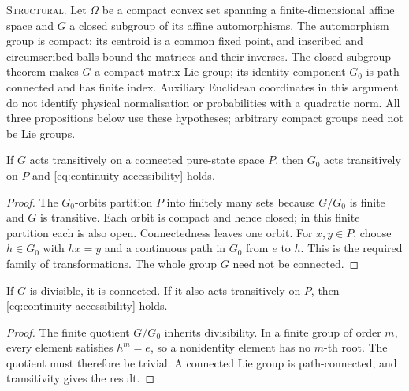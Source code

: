 \noindent\textsc{Structural.}
Let $\Omega$ be a compact convex set spanning a finite-dimensional affine
space and $G$ a closed subgroup of its affine automorphisms. The
automorphism group is compact: its centroid is a common fixed point, and
inscribed and circumscribed balls bound the matrices and their inverses.
The closed-subgroup theorem makes $G$ a compact matrix Lie group; its
identity component $G_0$ is path-connected and has finite index. Auxiliary
Euclidean coordinates in this argument do not identify physical
normalisation or probabilities with a quadratic norm. All three propositions
below use these hypotheses; arbitrary compact groups need not be Lie groups.

\begin{proposition}
\label{prop:continuity-review-connected}
If $G$ acts transitively on a connected pure-state space $P$, then $G_0$
acts transitively on $P$ and \eqref{eq:continuity-accessibility} holds.
\end{proposition}
\begin{proof}
The $G_0$-orbits partition $P$ into finitely many sets because $G/G_0$ is
finite and $G$ is transitive. Each orbit is compact and hence closed; in
this finite partition each is also open. Connectedness leaves one orbit.
For $x,y\in P$, choose $h\in G_0$ with $hx=y$ and a continuous path in
$G_0$ from $e$ to $h$. This is the required family of transformations.
The whole group $G$ need not be connected.
\end{proof}

\begin{proposition}[Divisibility]
\label{prop:continuity-review-divisible}
If $G$ is divisible, it is connected. If it also acts transitively on $P$,
then \eqref{eq:continuity-accessibility} holds.
\end{proposition}
\begin{proof}
The finite quotient $G/G_0$ inherits divisibility. In a finite group of
order $m$, every element satisfies $h^m=e$, so a nonidentity element has
no $m$-th root. The quotient must therefore be trivial. A connected Lie
group is path-connected, and transitivity gives the result.
\end{proof}

